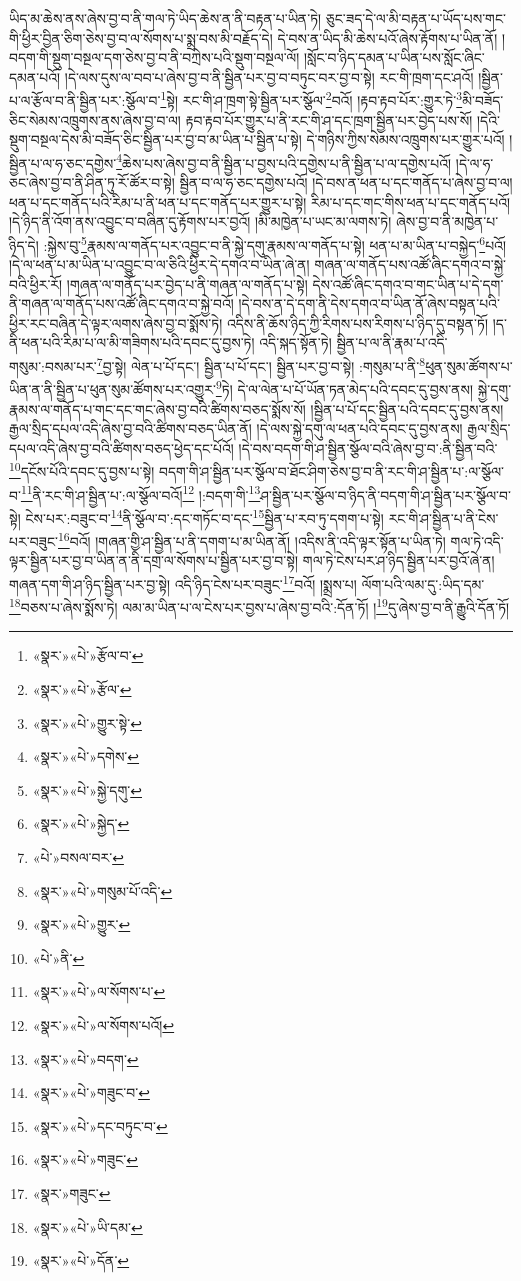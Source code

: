 ཡིད་མ་ཆེས་ནས་ཞེས་བྱ་བ་ནི་གལ་ཏེ་ཡིད་ཆེས་ན་ནི་བརྟན་པ་ཡིན་ཏེ། ཅུང་ཟད་དེ་ལ་མི་བརྟན་པ་ཡོད་པས་གང་གི་ཕྱིར་བྱིན་ཅིག་ཅེས་བྱ་བ་ལ་སོགས་པ་སྨྲ་བས་མི་བརྗོད་དེ། དེ་བས་ན་ཡིད་མི་ཆེས་པའོ་ཞེས་རྟོགས་པ་ཡིན་ནོ། །བདག་གི་སྡུག་བསྔལ་དག་ཅེས་བྱ་བ་ནི་བཀྲེས་པའི་སྡུག་བསྔལ་ལོ། །སློང་བ་ཉིད་དམན་པ་ཡིན་པས་སློང་ཞིང་དམན་པའོ། །དེ་ལས་དུས་ལ་བབ་པ་ཞེས་བྱ་བ་ནི་སྦྱིན་པར་བྱ་བ་བཏུང་བར་བྱ་བ་སྟེ། རང་གི་ཁྲག་དང་ཤའོ། །སྦྱིན་པ་ལ་རྩོལ་བ་ནི་སྦྱིན་པར་:སྩོལ་བ་\footnote{«སྣར་»«པེ་»རྩོལ་བ་}སྟེ། རང་གི་ཤ་ཁྲག་སྟེ་སྦྱིན་པར་སྩོལ་\footnote{«སྣར་»«པེ་»རྩོལ་}བའོ། །རྟབ་རྟབ་པོར་:གྱུར་ཏེ་\footnote{«སྣར་»«པེ་»གྱུར་སྟེ་}མི་བཟོད་ཅིང་སེམས་འཁྲུགས་ནས་ཞེས་བྱ་བ་ལ། རྟབ་རྟབ་པོར་གྱུར་པ་ནི་རང་གི་ཤ་དང་ཁྲག་སྦྱིན་པར་བྱེད་པས་སོ། །དེའི་སྡུག་བསྔལ་དེས་མི་བཟོད་ཅིང་སྦྱིན་པར་བྱ་བ་མ་ཡིན་པ་སྦྱིན་པ་སྟེ། དེ་གཉིས་ཀྱིས་སེམས་འཁྲུགས་པར་གྱུར་པའོ། །སྦྱིན་པ་ལ་ཧ་ཅང་དགྱེས་\footnote{«སྣར་»«པེ་»དགེས་}ཆེས་པས་ཞེས་བྱ་བ་ནི་སྦྱིན་པ་བྱས་པའི་དགྱེས་པ་ནི་སྦྱིན་པ་ལ་དགྱེས་པའོ། །དེ་ལ་ཧ་ཅང་ཞེས་བྱ་བ་ནི་ཤིན་ཏུ་རོ་ཚོར་བ་སྟེ། སྦྱིན་བ་ལ་ཧ་ཅང་དགྱེས་པའོ། །དེ་བས་ན་ཕན་པ་དང་གནོད་པ་ཞེས་བྱ་བ་ལ། ཕན་པ་དང་གནོད་པའི་རིམ་པ་ནི་ཕན་པ་དང་གནོད་པར་གྱུར་པ་སྟེ། རིམ་པ་དང་གང་གིས་ཕན་པ་དང་གནོད་པའོ། །དེ་ཉིད་ནི་འོག་ནས་འབྱུང་བ་བཞིན་དུ་རྟོགས་པར་བྱའོ། །མི་མཁྱེན་པ་ཡང་མ་ལགས་ཏེ། ཞེས་བྱ་བ་ནི་མཁྱེན་པ་ཉིད་དེ། :སྐྱེས་བུ་\footnote{«སྣར་»«པེ་»སྐྱེ་དགུ་}རྣམས་ལ་གནོད་པར་འབྱུང་བ་ནི་སྐྱེ་དགུ་རྣམས་ལ་གནོད་པ་སྟེ། ཕན་པ་མ་ཡིན་པ་བསྐྱེད་\footnote{«སྣར་»«པེ་»སྐྱེད་}པའོ། །དེ་ལ་ཕན་པ་མ་ཡིན་པ་འབྱུང་བ་ལ་ཅིའི་ཕྱིར་དེ་དགའ་བ་ཡིན་ཞེ་ན། གཞན་ལ་གནོད་པས་འཚོ་ཞིང་དགའ་བ་སྐྱེ་བའི་ཕྱིར་རོ། །གཞན་ལ་གནོད་པར་བྱེད་པ་ནི་གཞན་ལ་གནོད་པ་སྟེ། དེས་འཚོ་ཞིང་དགའ་བ་གང་ཡིན་པ་དེ་དག་ནི་གཞན་ལ་གནོད་པས་འཚོ་ཞིང་དགའ་བ་སྐྱེ་བའོ། །དེ་བས་ན་དེ་དག་ནི་དེས་དགའ་བ་ཡིན་ནོ་ཞེས་བསྟན་པའི་ཕྱིར་རང་བཞིན་དེ་ལྟར་ལགས་ཞེས་བྱ་བ་སྨོས་ཏེ། འདིས་ནི་ཆོས་ཉིད་ཀྱི་རིགས་པས་རིགས་པ་ཉིད་དུ་བསྟན་ཏོ། །ད་ནི་ཕན་པའི་རིམ་པ་ལ་མི་གཟིགས་པའི་དབང་དུ་བྱས་ཏེ། འདི་སྐད་སྟོན་ཏེ། སྦྱིན་པ་ལ་ནི་རྣམ་པ་འདི་གསུམ་:བསམ་པར་\footnote{«པེ་»བསལ་བར་}བྱ་སྟེ། ལེན་པ་པོ་དང་། སྦྱིན་པ་པོ་དང་། སྦྱིན་པར་བྱ་བ་སྟེ། :གསུམ་པ་ནི་\footnote{«སྣར་»«པེ་»གསུམ་པོ་འདི་}ཕུན་སུམ་ཚོགས་པ་ཡིན་ན་ནི་སྦྱིན་པ་ཕུན་སུམ་ཚོགས་པར་འགྱུར་\footnote{«སྣར་»«པེ་»གྱུར་}ཏེ། དེ་ལ་ལེན་པ་པོ་ཡོན་ཏན་མེད་པའི་དབང་དུ་བྱས་ནས། སྐྱེ་དགུ་རྣམས་ལ་གནོད་པ་གང་དང་གང་ཞེས་བྱ་བའི་ཚིགས་བཅད་སྨོས་སོ། །སྦྱིན་པ་པོ་དང་སྦྱིན་པའི་དབང་དུ་བྱས་ནས། རྒྱལ་སྲིད་དཔལ་འདི་ཞེས་བྱ་བའི་ཚིགས་བཅད་ཡིན་ནོ། །དེ་ལས་སྐྱེ་དགུ་ལ་ཕན་པའི་དབང་དུ་བྱས་ནས། རྒྱལ་སྲིད་དཔལ་འདི་ཞེས་བྱ་བའི་ཚིགས་བཅད་ཕྱེད་དང་པོའོ། །དེ་བས་བདག་གི་ཤ་སྦྱིན་སྩོལ་བའི་ཞེས་བྱ་བ་:ནི་སྦྱིན་བའི་\footnote{«པེ་»ནི་}དངོས་པོའི་དབང་དུ་བྱས་པ་སྟེ། བདག་གི་ཤ་སྦྱིན་པར་སྩོལ་བ་ཐོང་ཤིག་ཅེས་བྱ་བ་ནི་རང་གི་ཤ་སྦྱིན་པ་:ལ་སྩོལ་བ་\footnote{«སྣར་»«པེ་»ལ་སོགས་པ་}ནི་རང་གི་ཤ་སྦྱིན་པ་:ལ་སྩོལ་བའོ།\footnote{«སྣར་»«པེ་»ལ་སོགས་པའོ།} །:བདག་གི་\footnote{«སྣར་»«པེ་»བདག་}ཤ་སྦྱིན་པར་སྩོལ་བ་ཉིད་ནི་བདག་གི་ཤ་སྦྱིན་པར་སྩོལ་བ་སྟེ། ངེས་པར་:བཟུང་བ་\footnote{«སྣར་»«པེ་»གཟུང་བ་}ནི་སྩོལ་བ་:དང་གཏོང་བ་དང་\footnote{«སྣར་»«པེ་»དང་བཏུང་བ་}སྦྱིན་པ་རབ་ཏུ་དགག་པ་སྟེ། རང་གི་ཤ་སྦྱིན་པ་ནི་ངེས་པར་བཟུང་\footnote{«སྣར་»«པེ་»གཟུང་}བའོ། །གཞན་གྱི་ཤ་སྦྱིན་པ་ནི་དགག་པ་མ་ཡིན་ནོ། །འདིས་ནི་འདི་ལྟར་སྟོན་པ་ཡིན་ཏེ། གལ་ཏེ་འདི་ལྟར་སྦྱིན་པར་བྱ་བ་ཡིན་ན་ནི་དགྲ་ལ་སོགས་པ་སྦྱིན་པར་བྱ་བ་སྟེ། གལ་ཏེ་ངེས་པར་ཤ་ཉིད་སྦྱིན་པར་བྱའོ་ཞེ་ན། གཞན་དག་གི་ཤ་ཉིད་སྦྱིན་པར་བྱ་སྟེ། འདི་ཉིད་ངེས་པར་བཟུང་\footnote{«སྣར་»གཟུང་}བའོ། །སྨྲས་པ། ལོག་པའི་ལམ་དུ་:ཡིད་དམ་\footnote{«སྣར་»«པེ་»ཡི་དམ་}བཅས་པ་ཞེས་སྨོས་ཏེ། ལམ་མ་ཡིན་པ་ལ་ངེས་པར་བྱས་པ་ཞེས་བྱ་བའི་:དོན་ཏོ། །\footnote{«སྣར་»«པེ་»དོན་}དུ་ཞེས་བྱ་བ་ནི་རྒྱུའི་དོན་ཏོ། 